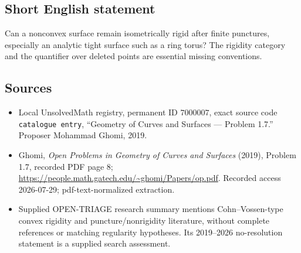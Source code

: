 \documentclass[11pt]{article}
\begin{document}
\subsection{Short English statement}
Can a nonconvex surface remain isometrically rigid after finite punctures, especially an analytic tight surface such as a ring torus? The rigidity category and the quantifier over deleted points are essential missing conventions.
\subsection{Sources}
\begin{itemize}
\item Local UnsolvedMath registry, permanent ID \(7000007\), exact source code \texttt{catalogue entry}, ``Geometry of Curves and Surfaces --- Problem 1.7.'' Proposer Mohammad Ghomi, 2019.
\item Ghomi, \emph{Open Problems in Geometry of Curves and Surfaces} (2019), Problem 1.7, recorded PDF page 8; \url{https://people.math.gatech.edu/~ghomi/Papers/op.pdf}. Recorded access 2026-07-29; pdf-text-normalized extraction.
\item Supplied OPEN-TRIAGE research summary mentions Cohn--Vossen-type convex rigidity and puncture/nonrigidity literature, without complete references or matching regularity hypotheses. Its 2019--2026 no-resolution statement is a supplied search assessment.
\end{itemize}
\end{document}
